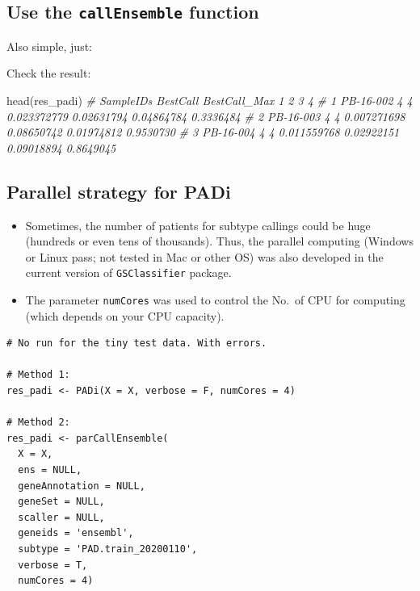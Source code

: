 \documentclass[
  12pt,
]{book}
\newenvironment{Shaded}{\begin{snugshade}}{\end{snugshade}}
\newcommand{\CommentTok}[1]{\textcolor[rgb]{0.56,0.35,0.01}{\textit{#1}}}
\newcommand{\FunctionTok}[1]{\textcolor[rgb]{0.00,0.00,0.00}{#1}}
\newcommand{\NormalTok}[1]{#1}
\begin{document}
\hypertarget{use-the-callensemble-function}{%
\subsection{\texorpdfstring{Use the \texttt{callEnsemble} function}{Use the callEnsemble function}}\label{use-the-callensemble-function}}

Also simple, just:

Check the result:

\begin{Shaded}
\begin{Highlighting}[]
\FunctionTok{head}\NormalTok{(res\_padi)}
\CommentTok{\#   SampleIDs BestCall BestCall\_Max           1          2          3         4}
\CommentTok{\# 1 PB{-}16{-}002        4            4 0.023372779 0.02631794 0.04864784 0.3336484}
\CommentTok{\# 2 PB{-}16{-}003        4            4 0.007271698 0.08650742 0.01974812 0.9530730}
\CommentTok{\# 3 PB{-}16{-}004        4            4 0.011559768 0.02922151 0.09018894 0.8649045}
\end{Highlighting}
\end{Shaded}

\hypertarget{parallel-strategy-for-padi}{%
\subsection{Parallel strategy for PADi}\label{parallel-strategy-for-padi}}

\begin{itemize}
\item
  Sometimes, the number of patients for subtype callings could be huge (hundreds or even tens of thousands). Thus, the parallel computing (Windows or Linux pass; not tested in Mac or other OS) was also developed in the current version of \texttt{GSClassifier} package.
\item
  The parameter \texttt{numCores} was used to control the No.~of CPU for computing (which depends on your CPU capacity).
\end{itemize}

\begin{verbatim}
# No run for the tiny test data. With errors.

# Method 1:
res_padi <- PADi(X = X, verbose = F, numCores = 4)

# Method 2: 
res_padi <- parCallEnsemble(
  X = X,
  ens = NULL,
  geneAnnotation = NULL,
  geneSet = NULL,
  scaller = NULL,
  geneids = 'ensembl',
  subtype = 'PAD.train_20200110',
  verbose = T,
  numCores = 4)
\end{verbatim}
\end{document}
